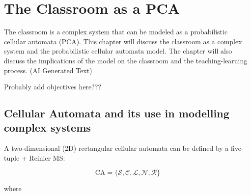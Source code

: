 \chapter{The Classroom as a PCA}
\hspace{\parindent} The classroom is a complex system that can be modeled as a probabilistic cellular automata (PCA). 
This chapter will discuss the classroom as a complex system and the probabilistic cellular automata model. 
The chapter will also discuss the implications of the model on the classroom and the teaching-learning process. 
(AI Generated Text)

Probably add objectives here???

\section{Cellular Automata and its use in modelling complex systems}

A two-dimensional (2D) rectangular cellular automata can be defined by a five-tuple \cite{arciaga2009experimental} + Reinier MS:

\begin{equation}
    \label{eq:CA definition}
    \text{CA} = \lbrace \mathcal{S,C,L,N,R} \rbrace
\end{equation}

where
\newcommand\itemS{\item[$\mathcal{S}=$]}
\newcommand\itemC{\item[$\mathcal{C}=$]}
\newcommand\itemL{\item[$\mathcal{L}=$]}
\newcommand\itemN{\item[$\mathcal{N}=$]}
\newcommand\itemR{\item[$\mathcal{R}=$]}

